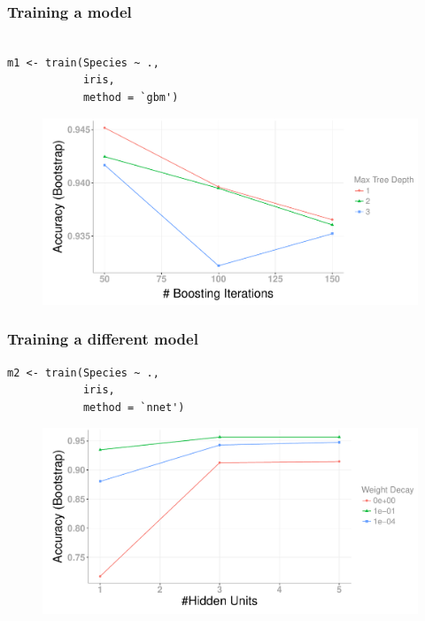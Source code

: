 \documentclass{beamer}
\begin{document}
\begin{frame}[fragile]
\frametitle{Training a model}
\begin{Verbatim}

m1 <- train(Species ~ ., 
            iris,
            method = `gbm')

\end{Verbatim}

\begin{figure}
    \includegraphics[height = 0.5\textheight]{train_gbm}
\end{figure} 
\end{frame} 


\begin{frame}[fragile]
\frametitle{Training a different model}
\renewcommand{\FancyVerbFormatLine}[1]{%
   \ifnum\value{FancyVerbLine}=3\color{cyan}#1%
   \else #1\fi}

\begin{Verbatim}
m2 <- train(Species ~ ., 
            iris,
            method = `nnet')
\end{Verbatim}

\begin{figure}
    \includegraphics[height = 0.5\textheight]{train_nnet}
\end{figure} 
\end{frame} 
\end{document}
